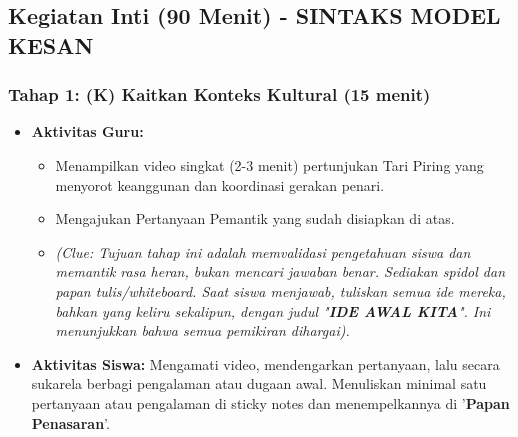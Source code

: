 \documentclass[a4paper,12pt]{article}
\begin{document}
\subsection{Kegiatan Inti (90 Menit) - SINTAKS MODEL KESAN}

\subsubsection{Tahap 1: (K) Kaitkan Konteks Kultural (15 menit)}
\begin{itemize}
\item \textbf{Aktivitas Guru:}
    \begin{itemize}
    \item Menampilkan video singkat (2-3 menit) pertunjukan Tari Piring yang menyorot keanggunan dan koordinasi gerakan penari.
    \item Mengajukan Pertanyaan Pemantik yang sudah disiapkan di atas.
    \item \textit{(Clue: Tujuan tahap ini adalah memvalidasi pengetahuan siswa dan memantik rasa heran, bukan mencari jawaban benar. Sediakan spidol dan papan tulis/whiteboard. Saat siswa menjawab, tuliskan semua ide mereka, bahkan yang keliru sekalipun, dengan judul "\textbf{IDE AWAL KITA}". Ini menunjukkan bahwa semua pemikiran dihargai).}
    \end{itemize}
\item \textbf{Aktivitas Siswa:} Mengamati video, mendengarkan pertanyaan, lalu secara sukarela berbagi pengalaman atau dugaan awal. Menuliskan minimal satu pertanyaan atau pengalaman di sticky notes dan menempelkannya di '\textbf{Papan Penasaran}'.
\end{itemize}
\end{document}

